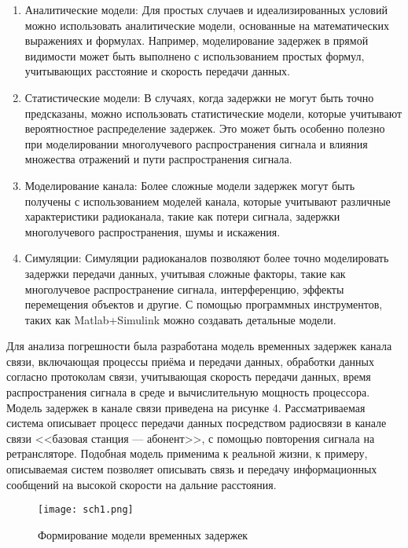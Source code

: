 \begin{onehalfspace}
\begin{enumerate} 
\item Аналитические модели: Для простых случаев и идеализированных условий можно использовать аналитические модели, основанные на математических выражениях и формулах. Например, моделирование задержек в прямой видимости может быть выполнено с использованием простых формул, учитывающих расстояние и скорость передачи данных.

\item Статистические модели: В случаях, когда задержки не могут быть точно предсказаны, можно использовать статистические модели, которые учитывают вероятностное распределение задержек. Это может быть особенно полезно при моделировании многолучевого распространения сигнала и влияния множества отражений и пути распространения сигнала.

\item Моделирование канала: Более сложные модели задержек могут быть получены с использованием моделей канала, которые учитывают различные характеристики радиоканала, такие как потери сигнала, задержки многолучевого распространения, шумы и искажения. 

\item Симуляции: Симуляции радиоканалов позволяют более точно моделировать задержки передачи данных, учитывая сложные факторы, такие как многолучевое распространение сигнала, интерференцию, эффекты перемещения объектов и другие. С помощью программных инструментов, таких как Matlab+Simulink можно создавать детальные модели.
\end{enumerate}     

	Для анализа погрешности была разработана модель временных задержек канала связи, включающая процессы приёма и передачи данных, обработки данных согласно протоколам связи, учитывающая скорость передачи данных, время распространения сигнала в среде и вычислительную мощность процессора. Модель задержек в канале связи приведена на рисунке 4. Рассматриваемая система описывает процесс передачи данных посредством радиосвязи в канале связи <<базовая станция — абонент>>, с помощью повторения сигнала на ретрансляторе. Подобная модель применима к реальной жизни, к примеру, описываемая систем позволяет описывать связь и передачу информационных сообщений на высокой скорости на дальние расстояния. 

\end{onehalfspace}

  \begin{center}
		\begin{figure}[h]
			\centering
			\texttt{[image: sch1.png]}
			\caption{Формирование модели временных задержек}
			\label{fig:model1}
		\end{figure}
	\end{center}

